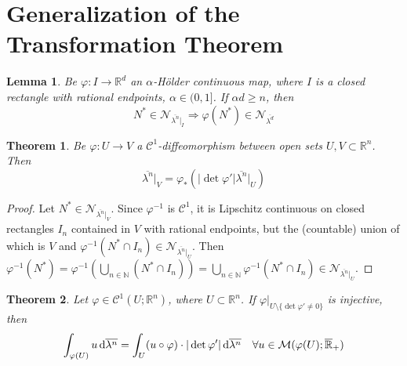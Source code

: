 \documentclass[11pt, a4paper, openany]{book}
\newtheorem{thm}{Theorem}\newtheorem{lem}{Lemma}\newtheorem{crl}{Corollary}
\theoremstyle{definition}
\begin{document}
\section{Generalization of the Transformation Theorem}
    \begin{lem}
        Be $\varphi:I\rightarrow \mathbb{R}^d$ an $\alpha$-H\"{o}lder continuous map, where $I$ is a closed rectangle with rational endpoints, $\alpha\in(0,1]$. If $\alpha d\geqslant n$, then
        \[N^*\in\mathscr{N}_{\overline{\lambda^n}|_I}\Longrightarrow \varphi(N^*)\in\mathscr{N}_{\overline{\lambda^d}}\]
    \end{lem}
    \begin{thm}
        Be $\varphi:U\rightarrow V$ a $\mathcal{C}^1$-diffeomorphism between open sets $U,V\subset\mathbb{R}^n$. Then
        \[
            \overline{\lambda^n}|_V=\varphi_*(|\det \varphi'|\overline{\lambda^n}|_U)
        \]
    \end{thm}
    \begin{proof}
        Let $N^*\in\mathscr{N}_{\overline{\lambda^n}|_V}$. Since $\varphi^{-1}$ is $\mathcal{C}^1$, it is Lipschitz continuous on closed rectangles $I_n$ contained in $V$ with rational endpoints, but the (countable) union of which is $V$ and $\varphi^{-1}(N^*\cap I_n)\in\mathscr{N}_{\overline{\lambda^n}|_U}$. Then $\varphi^{-1}(N^*)=\varphi^{-1}(\bigcup_{n\in\mathbb{N}}(N^*\cap I_n))=\bigcup_{n\in\mathbb{N}}\varphi^{-1}(N^*\cap I_n)\in\mathscr{N}_{\overline{\lambda^n}|_U}$.
    \end{proof}
    \begin{thm}
        Let $\varphi\in\mathcal{C}^1(U;\mathbb{R}^n)$, where $U\subset\mathbb{R}^n$. If $\varphi|_{U\setminus \{\det\varphi'\neq 0\}}$ is injective, then
        \[\int_{\varphi(U)}u\odif{\overline{\lambda^n}}=\int_U (u\circ\varphi)\cdot|\det\varphi'|\odif{\overline{\lambda^n}}\quad\forall u\in\mathcal{M}(\varphi(U);\overline{\mathbb{R}}_+)\]
    \end{thm}
\end{document}
